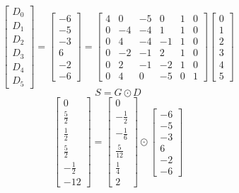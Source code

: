 \documentclass{article}%
\begin{document}
\[%
\left[\begin{matrix}D_{0}\\D_{1}\\D_{2}\\D_{3}\\D_{4}\\D_{5}\end{matrix}\right] = \left[\begin{matrix}-6\\-5\\-3\\6\\-2\\-6\end{matrix}\right] = \left[\begin{matrix}4 & 0 & -5 & 0 & 1 & 0\\0 & -4 & -4 & 1 & 1 & 0\\0 & 4 & -4 & -1 & 1 & 0\\0 & -2 & -1 & 2 & 1 & 0\\0 & 2 & -1 & -2 & 1 & 0\\0 & 4 & 0 & -5 & 0 & 1\end{matrix}\right] \left[\begin{matrix}0\\1\\2\\3\\4\\5\end{matrix}\right]%
\]%
\[%
S = G \odot D%
\]%
\[%
\left[\begin{matrix}0\\\frac{5}{2}\\\frac{1}{2}\\\frac{5}{2}\\- \frac{1}{2}\\-12\end{matrix}\right] = \left[\begin{matrix}0\\- \frac{1}{2}\\- \frac{1}{6}\\\frac{5}{12}\\\frac{1}{4}\\2\end{matrix}\right] \odot \left[\begin{matrix}-6\\-5\\-3\\6\\-2\\-6\end{matrix}\right]%
\]%
\end{document}
